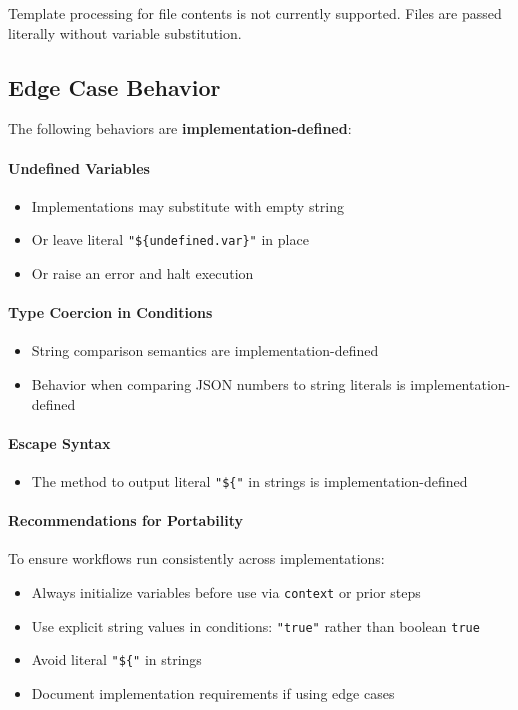 \documentclass[11pt,a4paper]{article}
\begin{document}
Template processing for file contents is not currently supported. Files are passed literally without variable substitution.

\subsection{Edge Case Behavior}

The following behaviors are \textbf{implementation-defined}:

\paragraph{Undefined Variables}
\begin{itemize}
    \item Implementations may substitute with empty string
    \item Or leave literal \texttt{"\$\{undefined.var\}"} in place
    \item Or raise an error and halt execution
\end{itemize}

\paragraph{Type Coercion in Conditions}
\begin{itemize}
    \item String comparison semantics are implementation-defined
    \item Behavior when comparing JSON numbers to string literals is implementation-defined
\end{itemize}

\paragraph{Escape Syntax}
\begin{itemize}
    \item The method to output literal \texttt{"\$\{"} in strings is implementation-defined
\end{itemize}

\paragraph{Recommendations for Portability}

To ensure workflows run consistently across implementations:
\begin{itemize}
    \item Always initialize variables before use via \texttt{context} or prior steps
    \item Use explicit string values in conditions: \texttt{"true"} rather than boolean \texttt{true}
    \item Avoid literal \texttt{"\$\{"} in strings
    \item Document implementation requirements if using edge cases
\end{itemize}
\end{document}
